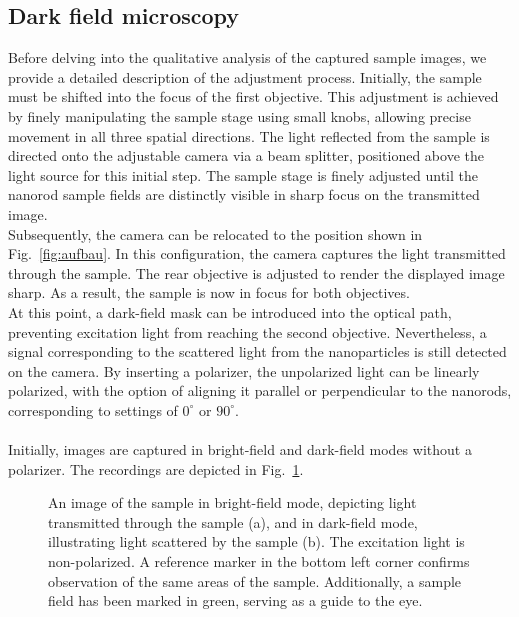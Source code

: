 \subsection{\label{sec:A1}Dark field microscopy}
Before delving into the qualitative analysis of the captured sample images, 
we provide a detailed description of the adjustment process. 
Initially, the sample must be shifted into the focus of the first objective. 
This adjustment is achieved by finely manipulating the sample stage using small knobs, 
allowing precise movement in all three spatial directions. 
The light reflected from the sample is directed onto the adjustable camera via a beam splitter, 
positioned above the light source for this initial step. 
The sample stage is finely adjusted until the nanorod sample fields are distinctly visible 
in sharp focus on the transmitted image. \\
Subsequently, the camera can be relocated to the position shown 
in Fig.~\ref{fig:aufbau}. 
In this configuration, the camera captures the light transmitted through the sample. 
The rear objective is adjusted to render the displayed image sharp. 
As a result, the sample is now in focus for both objectives. \\
At this point, a dark-field mask can be introduced into the optical path, 
preventing excitation light from reaching the second objective. 
Nevertheless, a signal corresponding to the scattered light from the nanoparticles is still 
detected on the camera. 
By inserting a polarizer, the unpolarized light can be linearly polarized, 
with the option of aligning it parallel or perpendicular to the nanorods, 
corresponding to settings of $0^{\circ}$ or $90^{\circ}$. \\ \\
Initially, images are captured in bright-field and dark-field modes without a polarizer. 
The recordings are depicted in Fig.~\ref{fig:bilder}.
\begin{figure}[h!]
    \centering
    \qquad
    \caption{\label{fig:bilder}An image of the sample in bright-field mode, depicting light transmitted 
    through the sample (a), and in dark-field mode, illustrating light scattered by the sample (b). 
    The excitation light is non-polarized. A reference marker in the bottom left corner confirms 
    observation of the same areas of the sample.
    Additionally, a sample field has been marked in green, serving as a guide to the eye.}
\end{figure}\FloatBarrier 